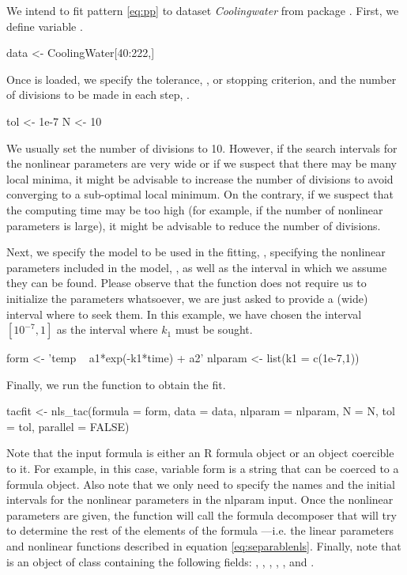 We intend to fit pattern \eqref{eq:pp} to dataset \textit{Coolingwater} from  package \citep{package_mosaicData}. First, we define variable .
\begin{example}
  data <- CoolingWater[40:222,]
\end{example}

Once  is loaded, we specify the tolerance, , or stopping criterion, and the number of divisions to be made in each step, .
\begin{example}
  tol <- 1e-7
  N <- 10
\end{example}
We usually set the number of divisions to 10. However, if the search intervals for the nonlinear parameters are very wide or if we suspect that there may be many local minima, it might be advisable to increase the number of divisions to avoid converging to a sub-optimal local minimum. On the contrary, if we suspect that the computing time may be too high (for example, if the number of nonlinear parameters is large), it might be advisable to reduce the number of divisions.

Next, we specify the model to be used in the fitting, , specifying the nonlinear parameters included in the model, , as well as the interval in which we assume they can be found. Please observe that the function does not require us to initialize the parameters whatsoever, we are just asked to provide a (wide) interval where to seek them. In this example, we have chosen the interval $[10^{-7},1]$ as the interval where $k_1$ must be sought.
\begin{example}
  form <- 'temp ~ a1*exp(-k1*time) + a2'
  nlparam <- list(k1 = c(1e-7,1))
\end{example}

Finally, we run the  function to obtain the fit. 
\begin{example}
  tacfit <- nls_tac(formula = form, data = data,  nlparam = nlparam, N = N, tol = tol,
    parallel = FALSE)
\end{example}
Note that the input formula is either an R formula object or an object coercible to it. For example, in this case, variable form is a string that can be coerced to a formula object. Also note that we only need to specify the names and the initial intervals for the nonlinear parameters in the nlparam  input. Once the nonlinear parameters are given, the function  will call the formula decomposer that will try to determine the rest of the elements of the formula ---i.e. the linear parameters and nonlinear functions described in equation \eqref{eq:separablenls}. Finally, note that  is an object of class  containing the following fields: , , , , ,  and .


